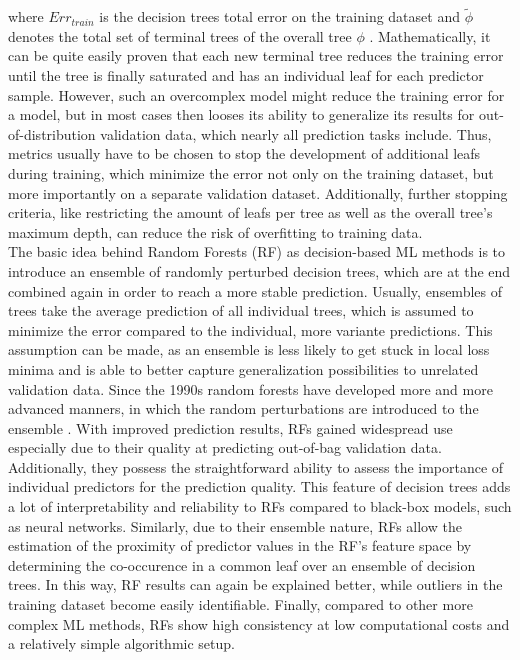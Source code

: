 \documentclass[ba-lentz.tex]{subfile}
\begin{document}
where $Err_{train}$ is the decision trees total error on the training dataset and $\tilde{\phi}$ denotes the total set of terminal trees of the overall tree $\phi$ \parencite{louppe_understanding_2014}.
Mathematically, it can be quite easily proven that each new terminal tree reduces the training error until the tree is finally saturated and has an individual leaf for each predictor sample.
However, such an overcomplex model might reduce the training error for a model, but in most cases then looses its ability to generalize its results for out-of-distribution validation data, which nearly all prediction tasks include.
Thus, metrics usually have to be chosen to stop the development of additional leafs during training, which minimize the error not only on the training dataset, but more importantly on a separate validation dataset.
Additionally, further stopping criteria, like restricting the amount of leafs per tree as well as the overall tree's maximum depth, can reduce the risk of overfitting to training data. \\
The basic idea behind Random Forests (RF) as decision-based ML methods is to introduce an ensemble of randomly perturbed decision trees, which are at the end combined again in order to reach a more stable prediction.
Usually, ensembles of trees take the average prediction of all individual trees, which is assumed to minimize the error compared to the individual, more variante predictions.
This assumption can be made, as an ensemble is less likely to get stuck in local loss minima and is able to better capture generalization possibilities to unrelated validation data.
Since the 1990s random forests have developed more and more advanced manners, in which the random perturbations are introduced to the ensemble \parencite{louppe_understanding_2014}.
With improved prediction results, RFs gained widespread use especially  due to their quality at predicting out-of-bag validation data.
Additionally, they possess the straightforward ability to assess the importance of individual predictors for the prediction quality.
This feature of decision trees adds a lot of interpretability and reliability to RFs compared to black-box models, such as neural networks.
Similarly, due to their ensemble nature, RFs allow the estimation of the proximity of predictor values in the RF's feature space by determining the co-occurence in a common leaf over an ensemble of decision trees.
In this way, RF results can again be explained better, while outliers in the training dataset become easily identifiable.
Finally, compared to other more complex ML methods, RFs show high consistency at low computational costs and a relatively simple algorithmic setup.
\end{document}
